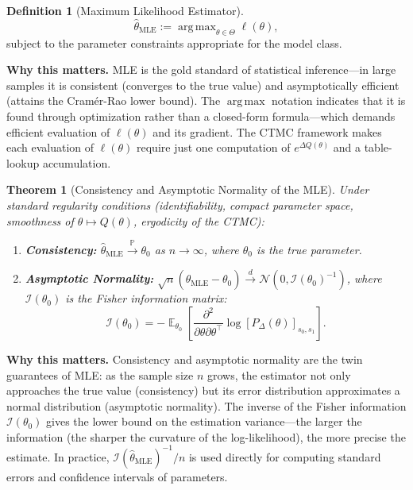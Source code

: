 \documentclass[11pt,a4paper,openany]{book}
\theoremstyle{definition}
\newtheorem{definition}{Definition}[chapter]
\theoremstyle{plain}
\newtheorem{theorem}{Theorem}[chapter]
\theoremstyle{remark}
\DeclareMathOperator{\E}{\mathbb{E}}
\DeclareMathOperator*{\argmax}{arg\,max}
\newcommand{\1}{\mathbbm{1}}
\newcommand{\Pbb}{\mathbb{P}}
\begin{document}
\begin{definition}[Maximum Likelihood Estimator]
\[
\hat{\theta}_{\text{MLE}} := \argmax_{\theta \in \Theta} \ell(\theta),
\]
subject to the parameter constraints appropriate for the model class.
\end{definition}

\medskip
\noindent\textbf{Why this matters.} MLE is the gold standard of statistical inference---in large samples it is consistent (converges to the true value) and asymptotically efficient (attains the Cram\'er-Rao lower bound). The $\argmax$ notation indicates that it is found through optimization rather than a closed-form formula---which demands efficient evaluation of $\ell(\theta)$ and its gradient. The CTMC framework makes each evaluation of $\ell(\theta)$ require just one computation of $e^{\Delta Q(\theta)}$ and a table-lookup accumulation.

\begin{theorem}[Consistency and Asymptotic Normality of the MLE]
Under standard regularity conditions (identifiability, compact parameter space, smoothness of $\theta \mapsto Q(\theta)$, ergodicity of the CTMC):
\begin{enumerate}[label=(\arabic*)]
    \item \textbf{Consistency:} $\hat{\theta}_{\text{MLE}} \xrightarrow{\Pbb} \theta_{0}$ as $n \to \infty$, where $\theta_{0}$ is the true parameter.
    \item \textbf{Asymptotic Normality:} $\sqrt{n}(\hat{\theta}_{\text{MLE}} - \theta_{0}) \xrightarrow{d} \mathcal{N}(0, \mathcal{I}(\theta_{0})^{-1})$, where $\mathcal{I}(\theta_{0})$ is the Fisher information matrix:
    \[
    \mathcal{I}(\theta_{0}) = -\E_{\theta_{0}}\left[ \frac{\partial^{2}}{\partial \theta \partial \theta^{\top}} \log [P_{\Delta}(\theta)]_{s_{0}, s_{1}} \right].
    \]
\end{enumerate}
\end{theorem}

\medskip
\noindent\textbf{Why this matters.} Consistency and asymptotic normality are the twin guarantees of MLE: as the sample size $n$ grows, the estimator not only approaches the true value (consistency) but its error distribution approximates a normal distribution (asymptotic normality). The inverse of the Fisher information $\mathcal{I}(\theta_0)$ gives the lower bound on the estimation variance---the larger the information (the sharper the curvature of the log-likelihood), the more precise the estimate. In practice, $\mathcal{I}(\hat{\theta}_{\text{MLE}})^{-1}/n$ is used directly for computing standard errors and confidence intervals of parameters.
\end{document}
